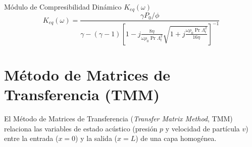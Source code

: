 \documentclass[11pt,a4paper]{article}
\begin{document}
\begin{infobox}{\texorpdfstring{Módulo de Compresibilidad Dinámico $K_{eq}(\omega)$ \citep{champoux1991}}{Módulo de Compresibilidad Dinámico K\_eq(omega)}}
\begin{equation}
K_{eq}(\omega) = \frac{\gamma P_0 / \phi}{\gamma - (\gamma - 1) \left[ 1 - j \frac{8 \eta}{\omega \rho_0 \operatorname{Pr} \Lambda_t^2} \sqrt{1 + j \frac{\omega \rho_0 \operatorname{Pr} \Lambda_t^2}{16 \eta}} \right]^{-1}}
\end{equation}
\end{infobox}

\section{Método de Matrices de Transferencia (TMM)}
\label{sec:tmm}

El Método de Matrices de Transferencia (\textit{Transfer Matrix Method}, TMM) relaciona las variables de estado acústico (presión $p$ y velocidad de partícula $v$) entre la entrada ($x=0$) y la salida ($x=L$) de una capa homogénea.
\end{document}
